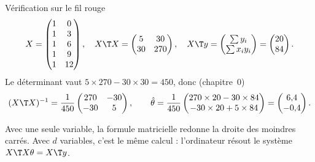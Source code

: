 \documentclass[aspectratio=169,11pt]{beamer}
\begin{document}
\begin{frame}{Vérification sur le fil rouge}
  \small
  \[
    X=\begin{pmatrix}1&0\\1&3\\1&6\\1&9\\1&12\end{pmatrix},\quad
    X\T X=\begin{pmatrix}5&30\\30&270\end{pmatrix},\quad
    X\T y=\begin{pmatrix}\sum y_i\\\sum x_iy_i\end{pmatrix}=\begin{pmatrix}20\\84\end{pmatrix}.
  \]
  Le déterminant vaut $5\times270-30\times30=450$, donc (chapitre~0)
  \[
    (X\T X)^{-1}=\frac1{450}\begin{pmatrix}270&-30\\-30&5\end{pmatrix},\qquad
    \hat\theta=\frac1{450}\begin{pmatrix}270\times20-30\times84\\-30\times20+5\times84\end{pmatrix}=\begin{pmatrix}6{,}4\\-0{,}4\end{pmatrix}.
  \]
  \begin{aretenir}
    Avec une seule variable, la formule matricielle redonne la droite des moindres carrés. Avec $d$ variables, c'est le même calcul : l'ordinateur résout le système $X\T X\theta=X\T y$.
  \end{aretenir}
\end{frame}
\end{document}
